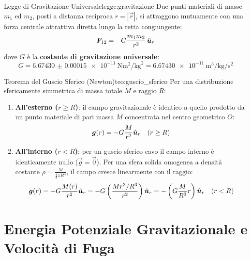 \begin{legge}{Legge di Gravitazione Universale}{legge:gravitazione}
Due punti materiali di masse $m_1$ ed $m_2$, posti a distanza reciproca $r = |\vec{r}|$, si attraggono mutuamente con una forza centrale attrattiva diretta lungo la retta congiungente:
\begin{equation}
    \bm{F}_{12} = -G\frac{m_1 m_2}{r^2}\,\hat{\bm{u}}_r
    \label{eq:gravitazione_newton}
\end{equation}
dove $G$ è la \textbf{costante di gravitazione universale}:
\begin{equation}
    G = \SI{6.67430(15)e-11}{\newton\metre\squared\per\kilogram\squared} = \SI{6.67430e-11}{\metre\cubed\per\kilogram\per\second\squared}
\end{equation}
\end{legge}

\begin{teorema}{Teorema del Guscio Sferico (Newton)}{teo:guscio_sferico}
Per una distribuzione sfericamente simmetrica di massa totale $M$ e raggio $R$:
\begin{enumerate}
    \item \textbf{All'esterno ($r \ge R$)}: il campo gravitazionale è identico a quello prodotto da un punto materiale di pari massa $M$ concentrata nel centro geometrico $O$:
    \begin{equation}
        \bm{g}(r) = -G\frac{M}{r^2}\hat{\bm{u}}_r \quad (r \ge R)
    \end{equation}
    \item \textbf{All'interno ($r < R$)}: per un guscio sferico cavo il campo interno è identicamente nullo ($\vec{g} = \vec{0}$). Per una sfera solida omogenea a densità costante $\rho = \frac{M}{\frac{4}{3}\pi R^3}$, il campo cresce linearmente con il raggio:
    \begin{equation}
        \bm{g}(r) = -G\frac{M(r)}{r^2}\hat{\bm{u}}_r = -G\left(\frac{M r^3/R^3}{r^2}\right)\hat{\bm{u}}_r = -\left(G\frac{M}{R^3} r\right)\hat{\bm{u}}_r \quad (r < R)
    \end{equation}
\end{enumerate}
\end{teorema}

\section{Energia Potenziale Gravitazionale e Velocità di Fuga}
\label{sec:energia_fuga}

